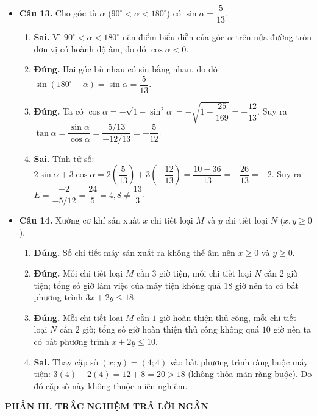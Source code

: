 \documentclass[12pt,a4paper]{article}
\begin{document}
\begin{itemize}[leftmargin=0.6cm, itemsep=4pt]
\item \textbf{Câu 13.} Cho góc tù $\alpha$ ($90^\circ < \alpha < 180^\circ$) có $\sin \alpha = \dfrac{5}{13}$.
\begin{enumerate}
    \item \textbf{Sai.} Vì $90^\circ < \alpha < 180^\circ$ nên điểm biểu diễn của góc $\alpha$ trên nửa đường tròn đơn vị có hoành độ âm, do đó $\cos \alpha < 0$.
    \item \textbf{Đúng.} Hai góc bù nhau có sin bằng nhau, do đó $\sin(180^\circ - \alpha) = \sin \alpha = \dfrac{5}{13}$.
    \item \textbf{Đúng.} Ta có $\cos \alpha = -\sqrt{1 - \sin^2\alpha} = -\sqrt{1 - \dfrac{25}{169}} = -\dfrac{12}{13}$. Suy ra $\tan \alpha = \dfrac{\sin \alpha}{\cos \alpha} = \dfrac{5/13}{-12/13} = -\dfrac{5}{12}$.
    \item \textbf{Sai.} Tính tử số: $2\sin \alpha + 3\cos \alpha = 2\left(\dfrac{5}{13}\right) + 3\left(-\dfrac{12}{13}\right) = \dfrac{10 - 36}{13} = -\dfrac{26}{13} = -2$. Suy ra $E = \dfrac{-2}{-5/12} = \dfrac{24}{5} = 4,8 \ne \dfrac{13}{3}$.
\end{enumerate}

\item \textbf{Câu 14.} Xưởng cơ khí sản xuất $x$ chi tiết loại $M$ và $y$ chi tiết loại $N$ ($x, y \ge 0$).
\begin{enumerate}
    \item \textbf{Đúng.} Số chi tiết máy sản xuất ra không thể âm nên $x \ge 0$ và $y \ge 0$.
    \item \textbf{Đúng.} Mỗi chi tiết loại $M$ cần $3$ giờ tiện, mỗi chi tiết loại $N$ cần $2$ giờ tiện; tổng số giờ làm việc của máy tiện không quá $18$ giờ nên ta có bất phương trình $3x + 2y \le 18$.
    \item \textbf{Đúng.} Mỗi chi tiết loại $M$ cần $1$ giờ hoàn thiện thủ công, mỗi chi tiết loại $N$ cần $2$ giờ; tổng số giờ hoàn thiện thủ công không quá $10$ giờ nên ta có bất phương trình $x + 2y \le 10$.
    \item \textbf{Sai.} Thay cặp số $(x; y) = (4; 4)$ vào bất phương trình ràng buộc máy tiện: $3(4) + 2(4) = 12 + 8 = 20 > 18$ (không thỏa mãn ràng buộc). Do đó cặp số này không thuộc miền nghiệm.
\end{enumerate}
\end{itemize}

\vspace{0.3cm}
\textbf{\large PHẦN III. TRẮC NGHIỆM TRẢ LỜI NGẮN}
\end{document}
